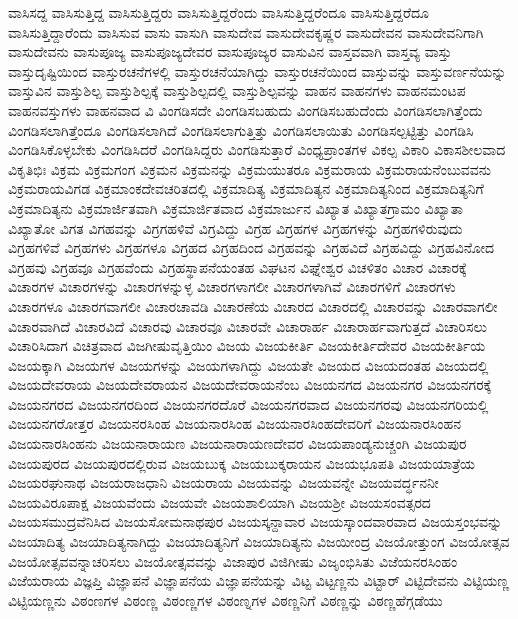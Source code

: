 {ವಾಸಿಸದ್ದ
ವಾಸಿಸುತ್ತಿದ್ದ
ವಾಸಿಸುತ್ತಿದ್ದರು
ವಾಸಿಸುತ್ತಿದ್ದರೆಂದು
ವಾಸಿಸುತ್ತಿದ್ದರೆಂದೂ
ವಾಸಿಸುತ್ತಿದ್ದರೆದೂ
ವಾಸಿಸುತ್ತಿದ್ದಾರೆಂದು
ವಾಸಿಸುವ
ವಾಸು
ವಾಸುಗಿ
ವಾಸುದೇವ
ವಾಸುದೇವಕೃಷ್ಣರ
ವಾಸುದೇವನ
ವಾಸುದೇವನಿಗಾಗಿ
ವಾಸುದೇವನು
ವಾಸುಪೂಜ್ಯ
ವಾಸುಪೂಜ್ಯದೇವರ
ವಾಸುಪೂಜ್ಯರ
ವಾಸುವಿನ
ವಾಸ್ತವವಾಗಿ
ವಾಸ್ತವ್ಯ
ವಾಸ್ತು
ವಾಸ್ತುದೃಷ್ಟಿಯಿಂದ
ವಾಸ್ತುರಚನೆಗಳಲ್ಲಿ
ವಾಸ್ತುರಚನೆಯಾಗಿದ್ದು
ವಾಸ್ತುರಚನೆಯಿಂದ
ವಾಸ್ತುವನ್ನು
ವಾಸ್ತುವರ್ಣನೆಯನ್ನು
ವಾಸ್ತುವಿನ
ವಾಸ್ತುಶಿಲ್ಪ
ವಾಸ್ತುಶಿಲ್ಪಕ್ಕೆ
ವಾಸ್ತುಶಿಲ್ಪದಲ್ಲಿ
ವಾಸ್ತುಶಿಲ್ಪವನ್ನು
ವಾಹನ
ವಾಹನಗಳು
ವಾಹನಮಂಟಪ
ವಾಹನವಸ್ತುಗಳು
ವಾಹನವಾದ
ವಿ
ವಿಂಗಡಿಸದೇ
ವಿಂಗಡಿಸಬಹುದು
ವಿಂಗಡಿಸಬಹುದೆಂದು
ವಿಂಗಡಿಸಲಾಗಿತ್ತೆಂದು
ವಿಂಗಡಿಸಲಾಗಿತ್ತೆಂದೂ
ವಿಂಗಡಿಸಲಾಗಿದೆ
ವಿಂಗಡಿಸಲಾಗುತ್ತಿತ್ತು
ವಿಂಗಡಿಸಲಾಯಿತು
ವಿಂಗಡಿಸಲ್ಪಟ್ಟಿತ್ತು
ವಿಂಗಡಿಸಿ
ವಿಂಗಡಿಸಿಕೊಳ್ಳಬೇಕು
ವಿಂಗಡಿಸಿದರೆ
ವಿಂಗಡಿಸಿದ್ದರು
ವಿಂಗಡಿಸುತ್ತಾರೆ
ವಿಂಧ್ಯಪ್ರಾಂತಗಳ
ವಿಕಲ್ಪ
ವಿಕಾರಿ
ವಿಕಾಸಶೀಲವಾದ
ವಿಕೃತಿಭಿಃ
ವಿಕ್ರಮ
ವಿಕ್ರಮಗಂಗ
ವಿಕ್ರಮನ
ವಿಕ್ರಮನನ್ನು
ವಿಕ್ರಮಯುತರೂ
ವಿಕ್ರಮರಾಯ
ವಿಕ್ರಮರಾಯನೆಂಬುವವನು
ವಿಕ್ರಮರಾಯವಿಗಡ
ವಿಕ್ರಮಾಂಕದೇವಚರಿತದಲ್ಲಿ
ವಿಕ್ರಮಾದಿತ್ಯ
ವಿಕ್ರಮಾದಿತ್ಯನ
ವಿಕ್ರಮಾದಿತ್ಯನಿಂದ
ವಿಕ್ರಮಾದಿತ್ಯನಿಗೆ
ವಿಕ್ರಮಾದಿತ್ಯನು
ವಿಕ್ರಮಾರ್ಜಿತವಾಗಿ
ವಿಕ್ರಮಾರ್ಜಿತವಾದ
ವಿಕ್ರಮಾರ್ಜುನ
ವಿಖ್ಯಾತ
ವಿಖ್ಯಾತಗ್ರಾಮಂ
ವಿಖ್ಯಾತಾ
ವಿಖ್ಯಾತೋ
ವಿಗತ
ವಿಗಹವನ್ನು
ವಿಗ್ರಗಹಳಿವೆ
ವಿಗ್ರವಿದ್ದು
ವಿಗ್ರಹ
ವಿಗ್ರಹಗಳ
ವಿಗ್ರಹಗಳನ್ನು
ವಿಗ್ರಹಗಳಿರುವುದು
ವಿಗ್ರಹಗಳಿವೆ
ವಿಗ್ರಹಗಳು
ವಿಗ್ರಹಗಳೂ
ವಿಗ್ರಹದ
ವಿಗ್ರಹದಿಂದ
ವಿಗ್ರಹವನ್ನು
ವಿಗ್ರಹವಿದೆ
ವಿಗ್ರಹವಿದ್ದು
ವಿಗ್ರಹವಿನೋದ
ವಿಗ್ರಹವು
ವಿಗ್ರಹವೂ
ವಿಗ್ರಹವೆಂದು
ವಿಗ್ರಹಸ್ಥಾಪನೆಯಂತಹ
ವಿಘಟನ
ವಿಘ್ನೇಶ್ವರ
ವಿಚಳಿತಂ
ವಿಚಾರ
ವಿಚಾರಕ್ಕೆ
ವಿಚಾರಗಳ
ವಿಚಾರಗಳನ್ನು
ವಿಚಾರಗಳನ್ನುಳ್ಳ
ವಿಚಾರಗಳಾಗಲೀ
ವಿಚಾರಗಳಾಗಿವೆ
ವಿಚಾರಗಳಿಗೆ
ವಿಚಾರಗಳು
ವಿಚಾರಗಳೂ
ವಿಚಾರಗವಾಗಲೀ
ವಿಚಾರಚಾವಡಿ
ವಿಚಾರಣೆಯ
ವಿಚಾರದ
ವಿಚಾರದಲ್ಲಿ
ವಿಚಾರವನ್ನು
ವಿಚಾರವಾಗಲೀ
ವಿಚಾರವಾಗಿದೆ
ವಿಚಾರವಿದೆ
ವಿಚಾರವು
ವಿಚಾರವೂ
ವಿಚಾರವೇ
ವಿಚಾರಾರ್ಹ
ವಿಚಾರಾರ್ಹವಾಗುತ್ತದೆ
ವಿಚಾರಿಸಲು
ವಿಚಾರಿಸಿದಾಗ
ವಿಚಿತ್ರವಾದ
ವಿಜಗೀಷುವೃತ್ತಿಯಿಂ
ವಿಜಯ
ವಿಜಯಕೀರ್ತಿ
ವಿಜಯಕೀರ್ತಿದೇವರ
ವಿಜಯಕೀರ್ತಿಯ
ವಿಜಯಕ್ಕಾಗಿ
ವಿಜಯಗಳ
ವಿಜಯಗಳನ್ನು
ವಿಜಯಗಳಾಗಿದ್ದು
ವಿಜಯತೇ
ವಿಜಯದ
ವಿಜಯದಂತಹ
ವಿಜಯದಲ್ಲಿ
ವಿಜಯದೇವರಾಯ
ವಿಜಯದೇವರಾಯನ
ವಿಜಯದೇವರಾಯನೆಂಬ
ವಿಜಯನಗದ
ವಿಜಯನಗರ
ವಿಜಯನಗರಕ್ಕೆ
ವಿಜಯನಗರದ
ವಿಜಯನಗರದಿಂದ
ವಿಜಯನಗರದೊರೆ
ವಿಜಯನಗರವಾದ
ವಿಜಯನಗರವು
ವಿಜಯನಗರಿಯಲ್ಲಿ
ವಿಜಯನಗರೋತ್ತರ
ವಿಜಯನರಸಿಂಹ
ವಿಜಯನಾರಸಿಂಹ
ವಿಜಯನಾರಸಿಂಹದೇವರಿಗೆ
ವಿಜಯನಾರಸಿಂಹನ
ವಿಜಯನಾರಸಿಂಹನು
ವಿಜಯನಾರಾಯಣ
ವಿಜಯನಾರಾಯಣದೇವರ
ವಿಜಯಪಾಂಡ್ಯನುಚ್ಚಂಗಿ
ವಿಜಯಪುರ
ವಿಜಯಪುರದ
ವಿಜಯಪುರದಲ್ಲಿರುವ
ವಿಜಯಬುಕ್ಕ
ವಿಜಯಬುಕ್ಕರಾಯನ
ವಿಜಯಭೂಪತಿ
ವಿಜಯಯಾತ್ರೆಯ
ವಿಜಯರಘುನಾಥ
ವಿಜಯರಾಜಧಾನಿ
ವಿಜಯರಾಯ
ವಿಜಯವನ್ನು
ವಿಜಯವನ್ನೇ
ವಿಜಯವರ್ದ್ಧನನೀ
ವಿಜಯವಿರೂಪಾಕ್ಷ
ವಿಜಯವೆಂದು
ವಿಜಯವೇ
ವಿಜಯಶಾಲಿಯಾಗಿ
ವಿಜಯಶ್ರೀ
ವಿಜಯಸಂವತ್ಸರದ
ವಿಜಯಸಮುದ್ರವೆನಿಸಿದ
ವಿಜಯಸೋಮನಾಥಪುರ
ವಿಜಯಸ್ಕನ್ದಾವಾರ
ವಿಜಯಸ್ಕಾಂದವಾರವಾದ
ವಿಜಯಸ್ತಂಭವನ್ನು
ವಿಜಯಾದಿತ್ಯ
ವಿಜಯಾದಿತ್ಯನಾಗಿದ್ದು
ವಿಜಯಾದಿತ್ಯನಿಗೆ
ವಿಜಯಾದಿತ್ಯನು
ವಿಜಯೀಂದ್ರ
ವಿಜಯೋತ್ತುಂಗ
ವಿಜಯೋತ್ಸವ
ವಿಜಯೋತ್ಸವವನ್ನಾಚರಿಸಲು
ವಿಜಯೋತ್ಸವವನ್ನು
ವಿಜಾಪುರ
ವಿಜಿಗೀಷು
ವಿಜೃಂಭಿಸಿತು
ವಿಜೆಯನರಸಿಂಹಂ
ವಿಜೆಯರಾಯ
ವಿಜ್ಞಪ್ತಿ
ವಿಜ್ಞಾಪನೆ
ವಿಜ್ಞಾಪನೆಯ
ವಿಜ್ಞಾಪನೆಯನ್ನು
ವಿಟ್ಟ
ವಿಟ್ಟಣ್ಣನು
ವಿಟ್ಟಾರ್
ವಿಟ್ಟಿದೇವನು
ವಿಟ್ಟಿಯಣ್ಣ
ವಿಟ್ಟಿಯಣ್ಣನು
ವಿಠಂಣಗಳ
ವಿಠಂಣ್ಣ
ವಿಠಂಣ್ಣಗಳ
ವಿಠಂಣ್ನಗಳ
ವಿಠಣ್ಣನಿಗೆ
ವಿಠಣ್ಣನ್ನು
ವಿಠಣ್ಣಹೆಗ್ಗಡೆಯು
}
